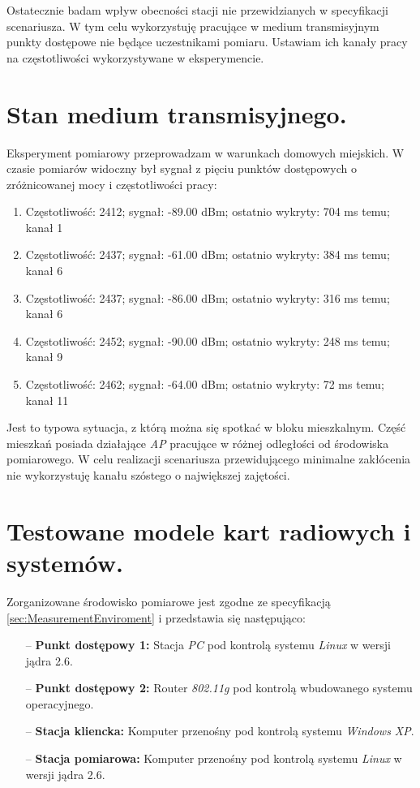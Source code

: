 Ostatecznie badam wpływ obecności stacji nie przewidzianych w specyfikacji scenariusza. W tym celu wykorzystuję pracujące w medium transmisyjnym punkty dostępowe nie będące uczestnikami pomiaru. Ustawiam ich kanały pracy na częstotliwości wykorzystywane w eksperymencie. 

\section{Stan medium transmisyjnego.}

Eksperyment pomiarowy przeprowadzam w warunkach domowych miejskich. W czasie pomiarów widoczny był sygnał z pięciu punktów dostępowych o zróżnicowanej mocy i częstotliwości pracy:

\begin{enumerate}
\item Częstotliwość: 2412; sygnał: -89.00 dBm; ostatnio wykryty: 704 ms temu; kanał 1
\item Częstotliwość: 2437; sygnał: -61.00 dBm; ostatnio wykryty: 384 ms temu; kanał 6
\item Częstotliwość: 2437; sygnał: -86.00 dBm; ostatnio wykryty: 316 ms temu; kanał 6
\item Częstotliwość: 2452; sygnał: -90.00 dBm; ostatnio wykryty: 248 ms temu; kanał 9
\item Częstotliwość: 2462; sygnał: -64.00 dBm; ostatnio wykryty: 72 ms temu; kanał 11
\end{enumerate}

Jest to typowa sytuacja, z którą można się spotkać w bloku mieszkalnym. Część mieszkań posiada działające \emph{AP} pracujące w różnej odległości od środowiska pomiarowego. W celu realizacji scenariusza przewidującego minimalne zakłócenia nie wykorzystuję kanału szóstego o największej zajętości.

\section{Testowane modele kart radiowych i systemów.}

Zorganizowane środowisko pomiarowe jest zgodne ze specyfikacją \ref{sec:MeasurementEnviroment} i przedstawia się następująco:
\begin{itemize}
\item[--] {\bf Punkt dostępowy 1:} Stacja \emph{PC} pod kontrolą systemu \emph{Linux} w wersji jądra 2.6.
\item[--] {\bf Punkt dostępowy 2:} Router \emph{802.11g} pod kontrolą wbudowanego systemu operacyjnego.
\item[--] {\bf Stacja kliencka:} Komputer przenośny pod kontrolą systemu \emph{Windows XP}.
\item[--] {\bf Stacja pomiarowa:} Komputer przenośny pod kontrolą systemu \emph{Linux} w wersji jądra 2.6.
\end{itemize}

